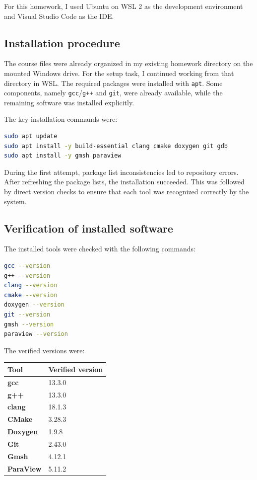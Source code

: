 \documentclass[11pt,a4paper]{article}
\begin{document}
For this homework, I used Ubuntu on WSL 2 as the development environment and Visual Studio Code as the IDE.

\subsection{Installation procedure}
The course files were already organized in my existing homework directory on the mounted Windows drive. For the setup task, I continued working from that directory in WSL. The required packages were installed with \texttt{apt}. Some components, namely \texttt{gcc}/\texttt{g++} and \texttt{git}, were already available, while the remaining software was installed explicitly.

The key installation commands were:

\begin{lstlisting}[language=bash]
sudo apt update
sudo apt install -y build-essential clang cmake doxygen git gdb
sudo apt install -y gmsh paraview
\end{lstlisting}

During the first attempt, package list inconsistencies led to repository errors. After refreshing the package lists, the installation succeeded. This was followed by direct version checks to ensure that each tool was recognized correctly by the system.

\subsection{Verification of installed software}
The installed tools were checked with the following commands:

\begin{lstlisting}[language=bash]
gcc --version
g++ --version
clang --version
cmake --version
doxygen --version
git --version
gmsh --version
paraview --version
\end{lstlisting}

The verified versions were:

\begin{center}
\renewcommand{\arraystretch}{1.2}
\begin{tabular}{>{\bfseries}p{}p{}}
\toprule
Tool & Verified version \\
\midrule
gcc & 13.3.0 \\
g++ & 13.3.0 \\
clang & 18.1.3 \\
CMake & 3.28.3 \\
Doxygen & 1.9.8 \\
Git & 2.43.0 \\
Gmsh & 4.12.1 \\
ParaView & 5.11.2 \\
\bottomrule
\end{tabular}
\end{center}
\end{document}
